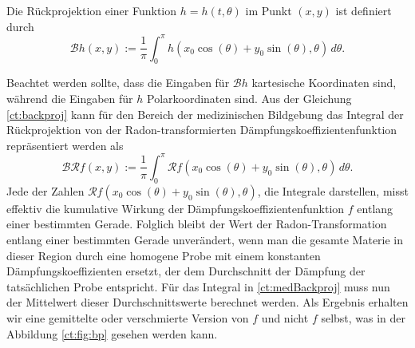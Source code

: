 \begin{definition}
%
	Die Rückprojektion einer Funktion $h = h(t, \theta)$ im Punkt $(x, y)$ ist definiert durch
	\begin{equation}\label{ct:backproj}
		\mathscr{B}h(x, y) := \dfrac{1}{\pi}\int_{0}^{\pi} h(x_0\cos(\theta) + y_0\sin(\theta), \theta) \,d\theta.
	\end{equation}
\end{definition}
Beachtet werden sollte, dass die Eingaben für $\mathscr{B}h$ kartesische Koordinaten sind, während die Eingaben für $h$ Polarkoordinaten sind.
Aus der Gleichung \eqref{ct:backproj} kann für den Bereich der medizinischen Bildgebung das Integral der Rückprojektion von der Radon-transformierten Dämpfungskoeffizientenfunktion repräsentiert werden als
%
\begin{equation}\label{ct:medBackproj}
	\mathscr{B}\mathscr{R}f(x, y) := \dfrac{1}{\pi}\int_{0}^{\pi} \mathscr{R}f(x_0\cos(\theta) + y_0\sin(\theta), \theta) \,d\theta.
\end{equation}
Jede der Zahlen $\mathscr{R}f(x_0\cos(\theta) + y_0\sin(\theta), \theta)$, die Integrale darstellen, misst effektiv die kumulative Wirkung der Dämpfungskoeffizientenfunktion $f$ entlang einer bestimmten Gerade. Folglich bleibt der Wert der Radon-Transformation entlang einer bestimmten Gerade unverändert, wenn man die gesamte Materie in dieser Region durch eine homogene Probe mit einem konstanten Dämpfungskoeffizienten ersetzt, der dem Durchschnitt der Dämpfung der tatsächlichen Probe entspricht. Für das Integral in \eqref{ct:medBackproj} muss nun der Mittelwert dieser Durchschnittswerte berechnet werden. Als Ergebnis erhalten wir eine \glqq gemittelte\grqq{} oder \glqq verschmierte\grqq{} Version von $f$ und nicht $f$ selbst, was in der Abbildung \ref{ct:fig:bp} gesehen werden kann.

